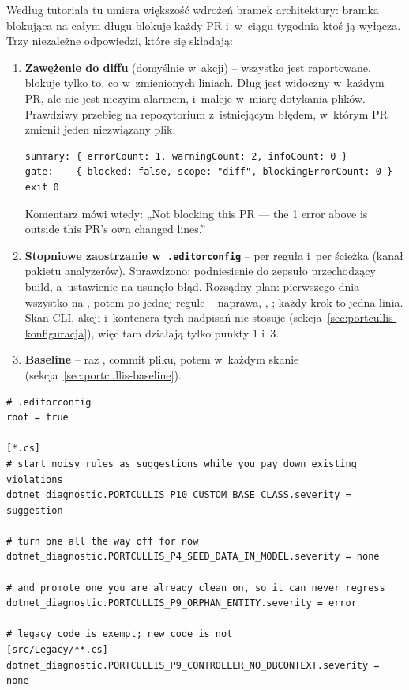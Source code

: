 Według tutoriala tu
umiera większość wdrożeń bramek architektury: bramka blokująca na całym długu blokuje każdy
PR i~w~ciągu tygodnia ktoś ją wyłącza. Trzy niezależne odpowiedzi, które się składają:
\begin{enumerate}[leftmargin=*]
  \item \textbf{Zawężenie do diffu} (domyślnie w~akcji) -- wszystko jest raportowane,
        blokuje tylko to, co w~zmienionych liniach. Dług jest widoczny w~każdym PR, ale nie
        jest niczyim alarmem, i~maleje w~miarę dotykania plików. Prawdziwy przebieg na
        repozytorium z~istniejącym błędem, w~którym PR zmienił jeden niezwiązany plik:
\begin{lstlisting}
summary: { errorCount: 1, warningCount: 2, infoCount: 0 }
gate:    { blocked: false, scope: "diff", blockingErrorCount: 0 }
exit 0
\end{lstlisting}
        Komentarz mówi wtedy: „Not blocking this PR — the 1 error above is outside this PR's
        own changed lines.”
  \item \textbf{Stopniowe zaostrzanie w~\texttt{.editorconfig}} -- per reguła i~per
        ścieżka (kanał pakietu analyzerów). Sprawdzono: podniesienie
         do  zepsuło przechodzący build, a~ustawienie
         na  usunęło błąd. Rozsądny plan:
        pierwszego dnia wszystko na , potem po jednej regule --
        naprawa, , ; każdy krok to jedna linia. Skan CLI,
        akcji i~kontenera tych nadpisań nie stosuje
        (sekcja~\ref{sec:portcullis-konfiguracja}), więc tam działają tylko punkty 1 i~3.
  \item \textbf{Baseline} -- raz , commit pliku, potem
         w~każdym skanie (sekcja~\ref{sec:portcullis-baseline}).
\end{enumerate}

\begin{lstlisting}
# .editorconfig
root = true

[*.cs]
# start noisy rules as suggestions while you pay down existing violations
dotnet_diagnostic.PORTCULLIS_P10_CUSTOM_BASE_CLASS.severity = suggestion

# turn one all the way off for now
dotnet_diagnostic.PORTCULLIS_P4_SEED_DATA_IN_MODEL.severity = none

# and promote one you are already clean on, so it can never regress
dotnet_diagnostic.PORTCULLIS_P9_ORPHAN_ENTITY.severity = error

# legacy code is exempt; new code is not
[src/Legacy/**.cs]
dotnet_diagnostic.PORTCULLIS_P9_CONTROLLER_NO_DBCONTEXT.severity = none
\end{lstlisting}

